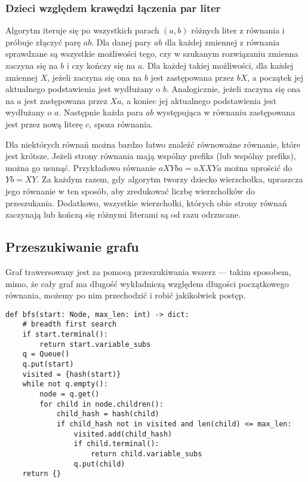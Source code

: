 \documentclass[leqno, 12pt]{article}
\begin{document}
\subsubsection*{Dzieci względem krawędzi łączenia par liter}
Algorytm iteruje się po wszystkich parach $(a, b)$ różnych liter z równania i próbuje złączyć parę $ab$.
Dla danej pary $ab$ dla każdej zmiennej z równania sprawdzane są wszystkie możliwości tego, czy w szukanym rozwiązaniu zmienna zaczyna się na $b$ i czy kończy się na $a$. Dla każdej takiej możliwości, dla każdej zmiennej $X$, jeżeli zaczyna się ona na $b$ jest zastępowana przez $bX$, a początek jej aktualnego podstawienia jest wydłużany o $b$. Analogicznie, jeżeli zaczyna się ona na $a$ jest zastępowana przez $Xa$, a koniec jej aktualnego podstawienia jest wydłużany o $a$. Następnie każda para $ab$ występująca w równaniu zastępowana jest przez nową literę $c$, spoza równania.

Dla niektórych równań można bardzo łatwo znaleźć równoważne równanie, które jest krótsze. Jeżeli strony równania mają wspólny prefiks (lub wspólny prefiks), można go usunąć. Przykładowo równanie $aXYba = aXXYa$ można uprościć do $Yb = XY$. Za każdym razem, gdy algorytm tworzy dziecko wierzchołka, upraszcza jego równanie w ten sposób, aby zredukować liczbę wierzchołków do przeszukania. Dodatkowo, wszystkie wierzchołki, których obie strony równań zaczynają lub kończą się różnymi literami są od razu odrzucane.

\subsection{Przeszukiwanie grafu}
Graf trawersowany jest za pomocą przeszukiwania wszerz --- takim sposobem, mimo, że cały graf ma długość wykładniczą względem długości początkowego równania, możemy po nim przechodzić i robić jakikolwiek postęp.

\begin{verbatim}
def bfs(start: Node, max_len: int) -> dict:
    # breadth first search
    if start.terminal():
        return start.variable_subs
    q = Queue()
    q.put(start)
    visited = {hash(start)}
    while not q.empty():
        node = q.get()
        for child in node.children():
            child_hash = hash(child)
            if child_hash not in visited and len(child) <= max_len:
                visited.add(child_hash)
                if child.terminal():
                    return child.variable_subs
                q.put(child)
    return {}
\end{verbatim}
\end{document}
